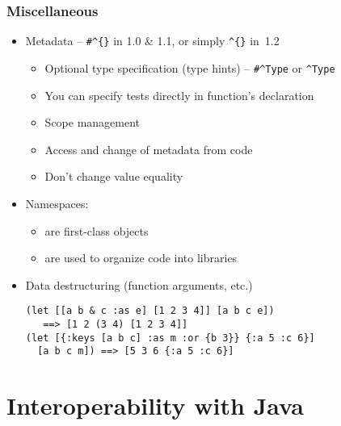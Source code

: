 \begin{frame}[fragile,t]
  \frametitle{Miscellaneous}
  \begin{itemize}
  \item Metadata -- \lstinline!#^{}! in 1.0 \& 1.1, or simply \lstinline!^{}! in~1.2
    \begin{itemize}
    \item Optional type specification (type hints) -- \lstinline!#^Type! or \lstinline!^Type!
    \item You can specify tests directly in function's declaration
    \item Scope management
    \item Access and change of metadata from code
    \item Don't change value equality
    \end{itemize}
  \item Namespaces:
    \begin{itemize}
    \item are first-class objects
    \item are used to organize code into libraries
    \end{itemize}
  \item Data destructuring (function arguments, etc.)
\begin{lstlisting}
(let [[a b & c :as e] [1 2 3 4]] [a b c e]) 
   ==> [1 2 (3 4) [1 2 3 4]]
(let [{:keys [a b c] :as m :or {b 3}} {:a 5 :c 6}]
  [a b c m]) ==> [5 3 6 {:a 5 :c 6}]
\end{lstlisting}
  \end{itemize}
\end{frame}


\section{Interoperability with Java}

